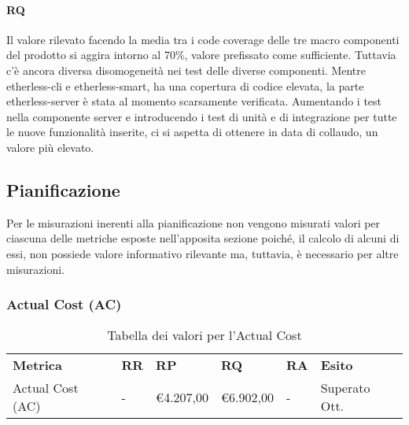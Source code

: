 \paragraph{RQ}
Il valore rilevato facendo la media tra i code coverage delle tre macro componenti del prodotto si aggira intorno al 70\%, valore prefissato come sufficiente. Tuttavia c'è ancora diversa disomogeneità nei test delle diverse componenti. Mentre etherless-cli e etherless-smart, ha una copertura di codice elevata, la parte etherless-server è stata al momento scarsamente verificata. Aumentando i test nella componente server e introducendo i test di unità e di integrazione per tutte le nuove funzionalità inserite, ci si aspetta di ottenere in data di collaudo, un valore più elevato.



\newpage
\subsection{Pianificazione}
Per le misurazioni inerenti alla pianificazione non vengono misurati valori per ciascuna delle metriche esposte nell'apposita sezione poiché, il calcolo di alcuni di essi, non possiede valore informativo rilevante ma, tuttavia, è necessario per altre misurazioni.

\subsubsection{Actual Cost (AC)}
\renewcommand{\arraystretch}{2.2}
\begin{longtable}{|C{4.5cm}|C{1.5cm}|C{1.5cm}|C{1.5cm}|C{1.5cm}|C{1.5cm}|}

	\caption{Tabella dei valori per l'Actual Cost}\\
	\hline

	\textbf{Metrica} & \textbf{RR}  & \textbf{RP} & \textbf{RQ} & \textbf{RA} & \textbf{Esito}
	\tabularnewline
	\endfirsthead

	Actual Cost (AC) & -  & \euro4.207,00	 & \euro6.902,00 & - & Superato Ott.
\end{longtable}
\begin{center}
\end{center}

